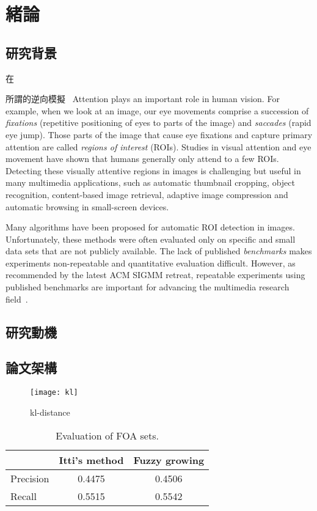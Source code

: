 \chapter{緒論}
\label{c:intro}
\section{研究背景}
在



所謂的逆向模擬~\cite{Zeman:1994vp}\cite{Stork:1983tx}
Attention plays an important role in human vision. For example, when
we look at an image, our eye movements comprise a succession of {\em
fixations} (repetitive positioning of eyes to parts of the image)
and {\em saccades} (rapid eye jump). Those parts of the image that
cause eye fixations and capture primary attention are called {\em
regions of interest} (ROIs). Studies in visual attention and eye
movement have shown that humans generally only attend to a few ROIs.
Detecting these visually attentive regions in images is challenging
but useful in many multimedia applications, such as automatic
thumbnail cropping, object recognition, content-based image
retrieval, adaptive image compression and automatic browsing in
small-screen devices.

Many algorithms have been proposed for automatic ROI detection in
images. Unfortunately, these methods were often evaluated only on
specific and small data sets that are not publicly available. The
lack of published {\em benchmarks} makes experiments non-repeatable
and quantitative evaluation difficult. However, as recommended by
the latest ACM SIGMM retreat, repeatable experiments using published
benchmarks are important for advancing the multimedia research
field~\cite{Rowe:2005:ASR}.
\section{研究動機}
\section{論文架構}
\begin{figure}
\centering
\texttt{[image: kl]}
\caption{kl-distance}
\label{kl}
\end{figure}

\begin{table}[t]
\begin{center}
\begin{tabular}{lcc}

\hline
                    &  {\small Itti's method}     & {\small Fuzzy growing}    \\
\hline
{\small Precision}           &  0.4475    & 0.4506 \\
{\small Recall}              &  0.5515    & 0.5542 \\
\hline

\end{tabular}
\caption[Evaluation of FOA sets]{\small Evaluation of FOA sets. } \label{t:FOA}
\end{center}
\end{table}
